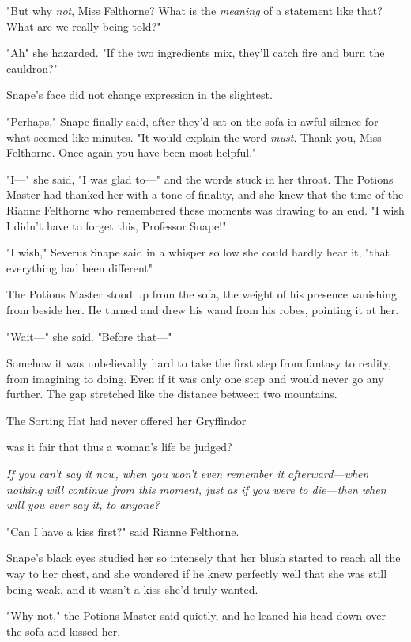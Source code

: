 "But why \emph{not}, Miss Felthorne? What is the \emph{meaning} of a statement
like that? What are we really being told?"

"Ah{\el}" she hazarded. "If the two ingredients mix, they'll catch fire and
burn the cauldron?"

Snape's face did not change expression in the slightest.

"Perhaps," Snape finally said, after they'd sat on the sofa in awful silence
for what seemed like minutes. "It would explain the word \emph{must}. Thank
you, Miss Felthorne. Once again you have been most helpful."

"I\mbox{---}" she said, "I was glad to\mbox{---}" and the words stuck in her throat. The
Potions Master had thanked her with a tone of finality, and she knew that the
time of the Rianne Felthorne who remembered these moments was drawing to an
end. "I wish I didn't have to forget this, Professor Snape!"

"I wish," Severus Snape said in a whisper so low she could hardly hear it,
"that everything had been different{\el}"

The Potions Master stood up from the sofa, the weight of his presence vanishing
from beside her. He turned and drew his wand from his robes, pointing it at her.

"Wait\mbox{---}" she said. "Before that\mbox{---}"

Somehow it was unbelievably hard to take the first step from fantasy to
reality, from imagining to doing. Even if it was only one step and would never
go any further. The gap stretched like the distance between two mountains.

The Sorting Hat had never offered her Gryffindor{\el}

{\el} was it fair that thus a woman's life be judged?

\emph{If you can't say it now, when you won't even remember it afterward---when
nothing will continue from this moment, just as if you were to die---then when
will you ever say it, to anyone?}

"Can I have a kiss first?" said Rianne Felthorne.

Snape's black eyes studied her so intensely that her blush started to reach all
the way to her chest, and she wondered if he knew perfectly well that she was
still being weak, and it wasn't a kiss she'd truly wanted.

"Why not," the Potions Master said quietly, and he leaned his head down over
the sofa and kissed her.

